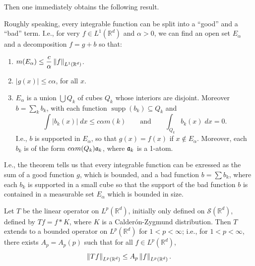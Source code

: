 \documentclass{article}
\begin{document}
Then one immediately obtains the following result. 
\begin{theorem}
	Roughly speaking, every integrable function can be split into a ``good'' and a ``bad'' term. I.e., for very $f \in L^{1}(\mathbb{R}^{d})$ and $\alpha > 0$, we can find an open set $E_{\alpha}$ and a decomposition $f = g + b$ so that: \vspace{-0.25cm} 
	\begin{enumerate}[itemsep =-2pt,label = (\alph{*})]
		\item $\displaystyle m(E_{\alpha}) \leq \frac{c}{\alpha}\left\Vert f \right\Vert_{L^{1}(\mathbb{R}^{d})}$. 
		\item $|g(x)| \leq c\alpha$, for all $x$. 
		\item $E_{\alpha}$ is a union $\bigcup Q_{k}$ of cubes $Q_{k}$ whose interiors are disjoint. Moreover $b = \sum_{k}b_{k}$, with each function $\operatorname{supp}(b_{k}) \subseteq Q_{k}$ and 
		\begin{equation*}
			\int |b_{k}(x)|\;dx \leq c\alpha m(k) \qquad \text{and} \qquad \int_{Q_{k}}b_{k}(x)\;dx = 0. 
		\end{equation*}
		I.e., $b$ is supported in $E_{\alpha}$, so that $g(x) = f(x)$ if $x \notin E_{\alpha}$. Moreover, each $b_{k}$ is of the form $c\alpha m(Q_{k})\frak{a}_{k}$, where $\frak{a}_{k}$ is a 1-atom. 
	\end{enumerate}
\end{theorem} 
I.e., the theorem tells us that every integrable function can be exressed as the sum of a good function $g$, which is bounded, and a bad function $b = \sum b_{k}$, where each $b_{k}$ is supported in a small cube so that the support of the bad function $b$ is contained in a measurable set $E_{\alpha}$ which is bounded in size. 
\begin{theorem}
	Let $T$ be the linear operator on $L^{p}(\mathbb{R}^{d})$, initially only defined on $\mathcal{S}(\mathbb{R}^{d})$, defined by $Tf = f \ast K$, where $K$ is a Calder\'on-Zygmund distribution. Then $T$ extends to a bounded operator on $L^{p}(\mathbb{R}^{d})$ for $1 < p < \infty$; i.e., for $1 < p < \infty$, there exists $A_{p} = A_{p}(p)$ such that for all $f \in L^{p}(\mathbb{R}^{d})$, 
	\begin{equation*}
		\left\Vert Tf \right\Vert_{L^{p}(\mathbb{R}^{d})} \leq A_{p}\left\Vert f \right\Vert_{L^{p}(\mathbb{R}^{d})}. 
	\end{equation*}
\end{theorem} 
\end{document}
